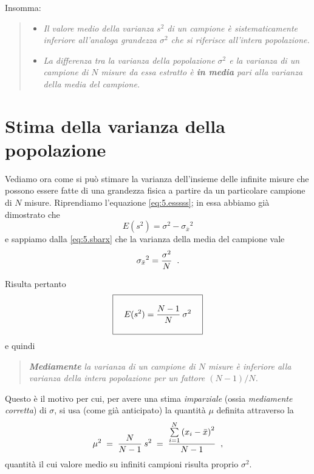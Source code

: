 Insomma:
\begin{quote}
  \begin{itemize}
  \item \textit{Il valore medio della varianza $s^2$ di un
      campione \`e sistematicamente inferiore all'analoga
      grandezza $\sigma^2$ che si riferisce all'intera
      popolazione.}
  \item \textit{La differenza tra la varianza della
      popolazione $\sigma^{2}$ e la varianza di un campione
      di $N$ misure da essa estratto \`e \textbf{in media}
      pari alla varianza della media del campione.}
  \end{itemize}
\end{quote}

\section{Stima della varianza della popolazione}
Vediamo ora come si pu\`o stimare la varianza dell'insieme
delle infinite misure che possono essere fatte di una
grandezza fisica a partire da un particolare campione di $N$
misure.  Riprendiamo l'equazione \eqref{eq:5.esssss}; in
essa abbiamo gi\`a dimostrato che
\begin{equation*}
  E(s^2) = \sigma^2 - {\sigma_{\bar x}}^2
\end{equation*}
e sappiamo dalla \eqref{eq:5.sbarx} che la varianza della
media del campione vale
\begin{equation*}
  {\sigma_{\bar x}}^2 = \frac{\sigma^2}{N} \;\; .
\end{equation*}

Risulta pertanto
\begin{equation*}
  \boxed{ \rule[-6mm]{0mm}{14mm} \quad
    E(s^{2}) = \frac{N-1}{N} \: \sigma^{2}
    \quad }
\end{equation*}
e quindi
\begin{quote}
  \textit{\textbf{Mediamente} la varianza di un
  campione di $N$ misure \`e inferiore alla varianza
  della intera popolazione per un fattore $(N-1)/N$.}
\end{quote}

Questo \`e il motivo per cui, per avere una stima
\emph{imparziale}%
(ossia \emph{mediamente corretta}) di $\sigma$, si usa (come
gi\`a anticipato) la quantit\`a $\mu$ definita attraverso la
\begin{equation*}
  \mu ^2 \; = \; \frac{N}{N-1} \: s^2 \; = \;
  \frac{\sum\limits_{i=1}^N \left( x_i - \bar x
    \right) ^2 }{N-1} \;\; ,
\end{equation*}
quantit\`a il cui valore medio su infiniti campioni risulta
proprio $\sigma^2$.

